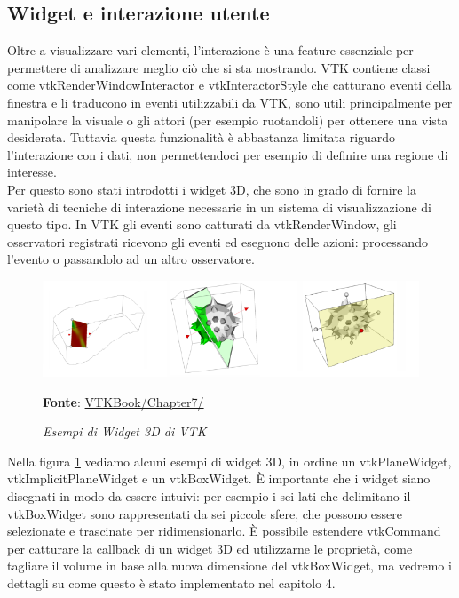 \subsection{Widget e interazione utente}\label{sec:widget-interazione}
Oltre a visualizzare vari elementi, l'interazione è una feature essenziale per permettere di analizzare meglio ciò che si sta mostrando. VTK contiene classi come vtkRenderWindowInteractor e vtkInteractorStyle che catturano eventi della finestra e li traducono in eventi utilizzabili da VTK, sono utili principalmente per manipolare la visuale o gli attori (per esempio ruotandoli) per ottenere una vista desiderata. Tuttavia questa funzionalità è abbastanza limitata riguardo l'interazione con i dati, non permettendoci per esempio di definire una regione di interesse.\\
Per questo sono stati introdotti i widget 3D, che sono in grado di fornire la varietà di tecniche di interazione necessarie in un sistema di visualizzazione di questo tipo. In VTK gli eventi sono catturati da vtkRenderWindow, gli osservatori registrati ricevono gli eventi ed eseguono delle azioni: processando l'evento o passandolo ad un altro osservatore.

\begin{figure}[h]
    \centering
    \includegraphics[scale=0.5]{immagini/volumerendering/widgets.png}
    \caption{\textit{Esempi di Widget 3D di VTK}}
    \textbf{Fonte}: \href{https://lorensen.github.io/VTKExamples/site/VTKBook/07Chapter7/}{VTKBook/Chapter7/}
    \label{fig: VTK 3D Widgets}
\end{figure}

Nella figura \ref{fig: VTK 3D Widgets} vediamo alcuni esempi di widget 3D, in ordine un vtkPlaneWidget, vtkImplicitPlaneWidget e un vtkBoxWidget. \`E importante che i widget siano disegnati in modo da essere intuivi: per esempio i sei lati che delimitano il vtkBoxWidget sono rappresentati da sei piccole sfere, che possono essere selezionate e trascinate per ridimensionarlo. \`E possibile estendere vtkCommand per catturare la callback di un widget 3D ed utilizzarne le proprietà, come tagliare il volume in base alla nuova dimensione del vtkBoxWidget, ma vedremo i dettagli su come questo è stato implementato nel capitolo 4.

